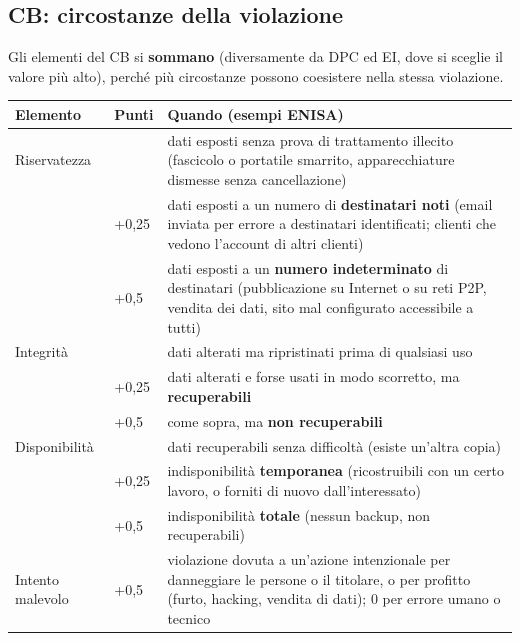 \subsection{CB: circostanze della violazione}
\label{sec:breach-cb}
Gli elementi del CB si \textbf{sommano} (diversamente da DPC ed EI, dove si sceglie il valore più alto),
perché più circostanze possono coesistere nella stessa violazione.
\begin{center}
\small
\begin{tabularx}{\linewidth}{>{\raggedright\arraybackslash}p{2.4cm} >{\raggedright\arraybackslash}p{1.1cm} X}
\toprule
\textbf{Elemento} & \textbf{Punti} & \textbf{Quando (esempi ENISA)}\\
\midrule
Riservatezza & 0 & dati esposti senza prova di trattamento illecito (fascicolo o portatile smarrito,
  apparecchiature dismesse senza cancellazione)\\
 & +0,25 & dati esposti a un numero di \textbf{destinatari noti} (email inviata per errore a destinatari
  identificati; clienti che vedono l'account di altri clienti)\\
 & +0,5 & dati esposti a un \textbf{numero indeterminato} di destinatari (pubblicazione su Internet o su
  reti P2P, vendita dei dati, sito mal configurato accessibile a tutti)\\
\midrule
Integrità & 0 & dati alterati ma ripristinati prima di qualsiasi uso\\
 & +0,25 & dati alterati e forse usati in modo scorretto, ma \textbf{recuperabili}\\
 & +0,5 & come sopra, ma \textbf{non recuperabili}\\
\midrule
Disponibilità & 0 & dati recuperabili senza difficoltà (esiste un'altra copia)\\
 & +0,25 & indisponibilità \textbf{temporanea} (ricostruibili con un certo lavoro, o forniti di nuovo
  dall'interessato)\\
 & +0,5 & indisponibilità \textbf{totale} (nessun backup, non recuperabili)\\
\midrule
Intento malevolo & +0,5 & violazione dovuta a un'azione intenzionale per danneggiare le persone o il
  titolare, o per profitto (furto, hacking, vendita di dati); 0 per errore umano o tecnico\\
\bottomrule
\end{tabularx}
\end{center}

